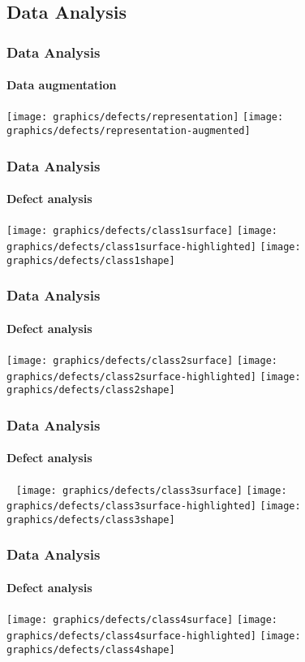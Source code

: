 \subsection{Data Analysis}

    \begin{frame}
        \frametitle{Data Analysis}
        \framesubtitle{Data augmentation}
        \centering
         {
            \texttt{[image: graphics/defects/representation]}
        }
         {
            \texttt{[image: graphics/defects/representation-augmented]}
        }
    \end{frame}

    \begin{frame}
        \frametitle{Data Analysis}
        \framesubtitle{Defect analysis}
         {
            \texttt{[image: graphics/defects/class1surface]}
        }
         {
            \texttt{[image: graphics/defects/class1surface-highlighted]}
        }
         {
            \texttt{[image: graphics/defects/class1shape]}
        }
    \end{frame}

    \begin{frame}
        \frametitle{Data Analysis}
        \framesubtitle{Defect analysis}
         {
            \texttt{[image: graphics/defects/class2surface]}
        }
         {
            \texttt{[image: graphics/defects/class2surface-highlighted]}
        }
         {
            \texttt{[image: graphics/defects/class2shape]}
        }
    \end{frame}

    \begin{frame}
        \frametitle{Data Analysis}
        \framesubtitle{Defect analysis}
         {
            \texttt{[image: graphics/defects/class3surface]}
        }
         {
            \texttt{[image: graphics/defects/class3surface-highlighted]}
        }
         {
            \texttt{[image: graphics/defects/class3shape]}
        }
    \end{frame}

    \begin{frame}
        \frametitle{Data Analysis}
        \framesubtitle{Defect analysis}
         {
            \texttt{[image: graphics/defects/class4surface]}
        }
         {
            \texttt{[image: graphics/defects/class4surface-highlighted]}
        }
         {
            \texttt{[image: graphics/defects/class4shape]}
        }
    \end{frame}